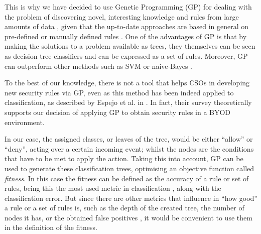 \documentclass[runningheads]{llncs}
\begin{document}
This is why we have decided to use Genetic Programming (GP) for
dealing with the problem of discovering novel, interesting knowledge
and rules from large amounts of data \cite{freitas2002data}, given
that the up-to-date approaches are based in general on pre-defined or
manually defined rules \cite{ali2015analysis}. One of
the advantages of GP is that by making the solutions to a problem
available as trees, they themselves can be seen as decision
tree classifiers \cite{safavian1990survey} and can be expressed as a
set of rules. Moreover, GP can outperform other methods such as SVM or naive-Bayes \cite{Castellanos19Medical}.

To the best of our knowledge, there is not a tool that helps CSOs in
developing new security rules via GP, even as this method has been
indeed applied to classification, as described by Espejo et al. in
\cite{espejo2010survey}. In fact, their survey theoretically supports our
decision of applying GP to obtain security rules in a BYOD
environment.

In our case, the assigned classes, or leaves of the tree, would be either ``allow''
or ``deny'', acting over a certain incoming event; whilst the nodes
are the conditions that have to be met to apply the action. Taking
this into account, GP can be used to generate these classification
trees, optimising an objective function called {\em fitness}. In this case the
fitness can be defined as the accuracy of a rule or set of rules, being this the most
used metric in classification \cite{witten2005data}, along with the
classification error. But since there are other metrics that influence in
``how good'' a rule or a set of rules is, such as the depth of the
created tree, the number of nodes it has, or the obtained false positives
\cite{back1996evolutionary}, it would be convenient to use them in
the definition of the fitness.
\end{document}
